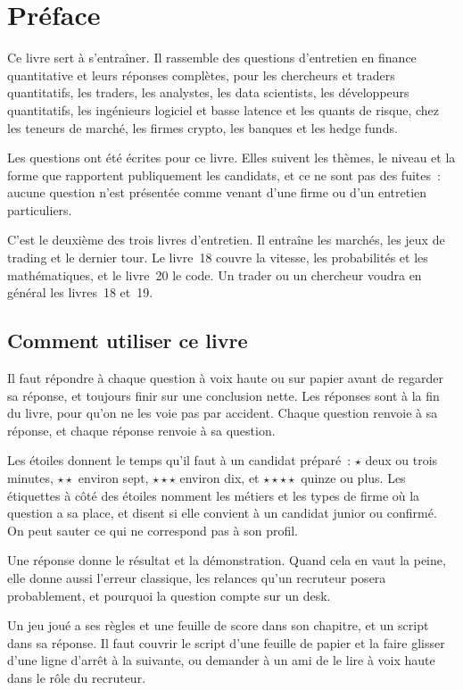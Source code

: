 \chapter{Préface}

Ce livre sert à s'entraîner. Il rassemble des questions d'entretien en finance quantitative et leurs réponses
complètes, pour les chercheurs et traders quantitatifs, les traders, les analystes, les data scientists, les
développeurs quantitatifs, les ingénieurs logiciel et basse latence et les quants de risque, chez les teneurs de
marché, les firmes crypto, les banques et les hedge funds.

Les questions ont été écrites pour ce livre. Elles suivent les thèmes, le niveau et la forme que rapportent
publiquement les candidats, et ce ne sont pas des fuites~: aucune question n'est présentée comme venant d'une firme ou
d'un entretien particuliers.

C'est le deuxième des trois livres d'entretien. Il entraîne les marchés, les jeux de trading et le dernier tour. Le
livre~18 couvre la vitesse, les probabilités et les mathématiques, et le livre~20 le code. Un trader ou un chercheur
voudra en général les livres~18 et~19.

\section*{Comment utiliser ce livre}

Il faut répondre à chaque question à voix haute ou sur papier avant de regarder sa réponse, et toujours finir sur une
conclusion nette. Les réponses sont à la fin du livre, pour qu'on ne les voie pas par accident. Chaque question renvoie
à sa réponse, et chaque réponse renvoie à sa question.

Les étoiles donnent le temps qu'il faut à un candidat préparé~: $\star$ deux ou trois minutes, $\star\star$ environ
sept, $\star\star\star$ environ dix, et $\star\star\star\star$ quinze ou plus. Les étiquettes à côté des étoiles
nomment les métiers et les types de firme où la question a sa place, et disent si elle convient à un candidat junior
ou confirmé. On peut sauter ce qui ne correspond pas à son profil.

Une réponse donne le résultat et la démonstration. Quand cela en vaut la peine, elle donne aussi l'erreur classique,
les relances qu'un recruteur posera probablement, et pourquoi la question compte sur un desk.

Un jeu joué a ses règles et une feuille de score dans son chapitre, et un script dans sa réponse. Il faut couvrir le
script d'une feuille de papier et la faire glisser d'une ligne d'arrêt à la suivante, ou demander à un ami de le lire
à voix haute dans le rôle du recruteur.


